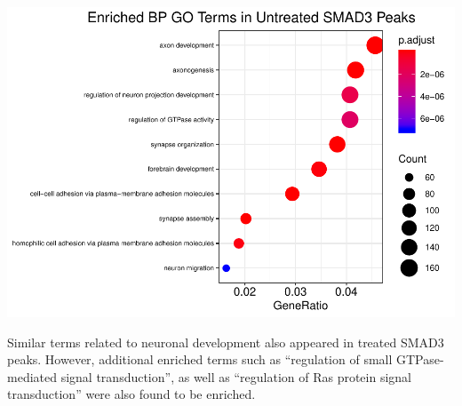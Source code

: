 \documentclass[]{article}
\begin{document}
\clearpage{}

\includegraphics{Bioinfo_Analysis_files/figure-latex/unnamed-chunk-12-1.pdf}

Similar terms related to neuronal development also appeared in treated
SMAD3 peaks. However, additional enriched terms such as ``regulation of
small GTPase-mediated signal transduction'', as well as ``regulation of
Ras protein signal transduction'' were also found to be enriched.

\clearpage{}
\end{document}
